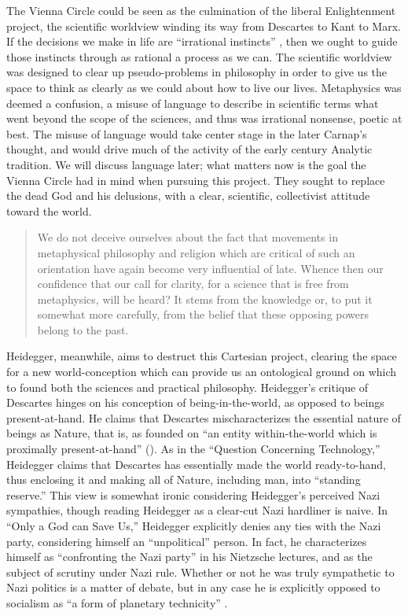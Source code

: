 \documentclass[leqno, 12pt]{turabian-researchpaper}
\begin{document}
	The Vienna Circle could be seen as the culmination of the liberal
	Enlightenment project, the scientific worldview winding its way from Descartes
	to Kant to Marx. If the decisions we make in life are \enquote{irrational instincts}
	\autocite[{p. 4}]{carnap1929}, then we ought to guide those instincts through
	as rational a process as we can. The scientific worldview was designed to clear
	up pseudo-problems in philosophy in order to give us the space to think as clearly
	as we could about how to live our lives. Metaphysics was deemed a confusion, a
	misuse of language to describe in scientific terms what went beyond the scope of
	the sciences, and thus was irrational nonsense, poetic at best. The misuse of
	language would take center stage in the later Carnap's thought, and would drive
	much of the activity of the early  century Analytic tradition. We will
	discuss language later; what matters now is the goal the Vienna Circle had in
	mind when pursuing this project. They sought to replace the dead God and his delusions,
	with a clear, scientific, collectivist attitude toward the world.

	\blockquote[{}]{We do not deceive ourselves about the fact that movements in metaphysical philosophy and religion which are critical of such an orientation have again become very influential of late. Whence then our confidence that our call for clarity, for a science that is free from metaphysics, will be heard? It stems from the knowledge or, to put it somewhat more carefully, from the belief that these opposing powers belong to the past.}

	Heidegger, meanwhile, aims to destruct this Cartesian project, clearing the
	space for a new world-conception which can provide us an ontological ground on
	which to found both the sciences and practical philosophy. Heidegger's critique
	of Descartes hinges on his conception of being-in-the-world, as opposed to
	beings present-at-hand. He claims that Descartes mischaracterizes the essential
	nature of beings as Nature, that is, as founded on \enquote{an entity within-the-world which is proximally present-at-hand}
	(). As in the \enquote{Question Concerning Technology,}
	\nocite{heidegger2008c} Heidegger claims that Descartes has essentially made
	the world ready-to-hand, thus enclosing it and making all of Nature, including
	man, into \enquote{standing reserve.} This view is somewhat ironic considering
	Heidegger's perceived Nazi sympathies, though reading Heidegger as a clear-cut
	Nazi hardliner is naive. In \enquote{Only a God can Save Us,} Heidegger explicitly
	denies any ties with the Nazi party, considering himself an \enquote{unpolitical}
	person. In fact, he characterizes himself as \enquote{confronting the Nazi party}
	in his Nietzsche lectures, and as the subject of scrutiny under Nazi rule.
	Whether or not he was truly sympathetic to Nazi politics is a matter of debate,
	but in any case he is explicitly opposed to socialism as \enquote{a form of planetary technicity}
	\autocite[p. 206]{heidegger1981}.
\end{document}
